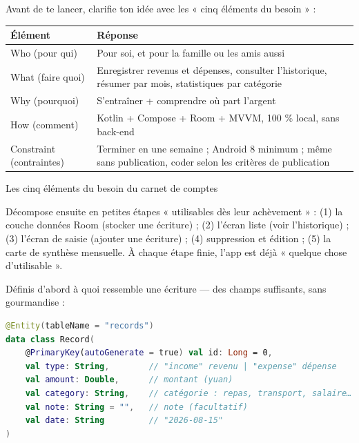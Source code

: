 


Avant de te lancer, clarifie ton idée avec les « cinq éléments du besoin » :

\begin{center}
\begin{tabularx}{\linewidth}{|X|X|}
\hline
\textbf{Élément} & \textbf{Réponse} \tabularnewline
\hline
Who (pour qui) & Pour soi, et pour la famille ou les amis aussi \tabularnewline
What (faire quoi) & Enregistrer revenus et dépenses, consulter l'historique, résumer par mois, statistiques par catégorie \tabularnewline
Why (pourquoi) & S'entraîner + comprendre où part l'argent \tabularnewline
How (comment) & Kotlin + Compose + Room + MVVM, 100 \% local, sans back-end \tabularnewline
Constraint (contraintes) & Terminer en une semaine ; Android 8 minimum ; même sans publication, coder selon les critères de publication \tabularnewline
\hline
\end{tabularx}
\end{center}

\begin{center}\small\color{gray}Les cinq éléments du besoin du carnet de comptes\end{center}

Décompose ensuite en petites étapes « utilisables dès leur achèvement » : (1) la couche données Room (stocker une écriture) ; (2) l'écran liste (voir l'historique) ; (3) l'écran de saisie (ajouter une écriture) ; (4) suppression et édition ; (5) la carte de synthèse mensuelle. À chaque étape finie, l'app est déjà « quelque chose d'utilisable ».


Définis d'abord à quoi ressemble une écriture — des champs suffisants, sans gourmandise :

\begin{lstlisting}[language=Kotlin]
@Entity(tableName = "records")
data class Record(
    @PrimaryKey(autoGenerate = true) val id: Long = 0,
    val type: String,        // "income" revenu | "expense" dépense
    val amount: Double,      // montant (yuan)
    val category: String,    // catégorie : repas, transport, salaire…
    val note: String = "",   // note (facultatif)
    val date: String         // "2026-08-15"
)
\end{lstlisting}

